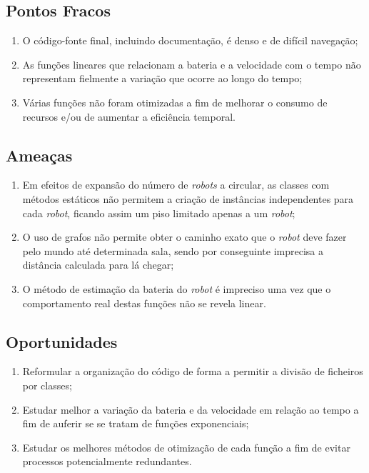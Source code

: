 \subsection{Pontos Fracos}
\label{ssec::reflexao:critica:fracos}

\begin{enumerate}
	\item O código-fonte final, incluindo documentação, é denso e de difícil navegação;
    
    \item As funções lineares que relacionam a bateria e a velocidade com o tempo não representam fielmente a variação que ocorre ao longo do tempo;
    
    \item Várias funções não foram otimizadas a fim de melhorar o consumo de recursos e/ou de aumentar a eficiência temporal.
\end{enumerate}


\subsection{Ameaças}
\label{ssec::reflexao:critica:ameacas}

\begin{enumerate}
	\item Em efeitos de expansão do número de \emph{robots} a circular, as classes com métodos estáticos não permitem a criação de instâncias independentes para cada \emph{robot}, ficando assim um piso limitado apenas a um \emph{robot};
	
	\item O uso de grafos não permite obter o caminho exato que o \emph{robot} deve fazer pelo mundo até determinada sala, sendo por conseguinte imprecisa a distância calculada para lá chegar;
	
	\item O método de estimação da bateria do \emph{robot} é impreciso uma vez que o comportamento real destas funções não se revela linear.
\end{enumerate}


\subsection{Oportunidades}
\label{ssec::reflexao:critica:oportunidades}

\begin{enumerate}
	\item Reformular a organização do código de forma a permitir a divisão de ficheiros por classes;
    
    \item Estudar melhor a variação da bateria e da velocidade em relação ao tempo a fim de auferir se se tratam de funções exponenciais;
    
    \item Estudar os melhores métodos de otimização de cada função a fim de evitar processos potencialmente redundantes.
\end{enumerate}


